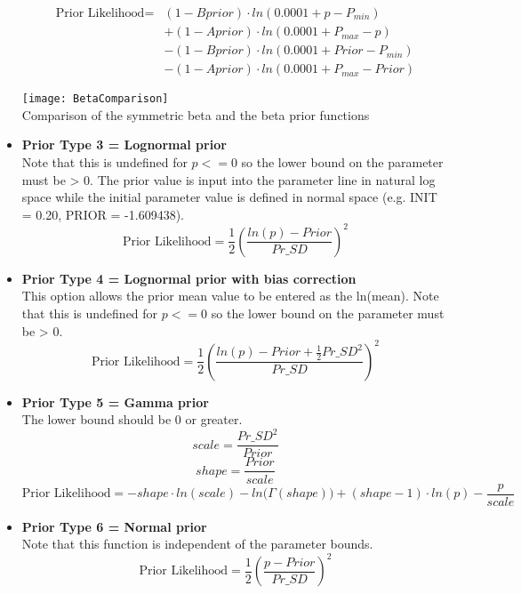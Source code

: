 \begin{itemize}
	\begin{equation}
          \begin{split}
		\text{Prior Likelihood} = & (1 - Bprior) \cdot ln(0.0001 + p - P_{min}) \\
		& + (1 - Aprior) \cdot ln(0.0001 + P_{max} - p) \\
		& - (1 - Bprior) \cdot ln(0.0001 + Prior - P_{min}) \\
		& - (1 - Aprior) \cdot ln(0.0001 + P_{max} - Prior)
	  \end{split}
	\end{equation}

	\begin{center}
		\texttt{[image: BetaComparison]}\\
		Comparison of the symmetric beta and the beta prior functions
	\end{center}

\item \textbf{Prior Type 3 = Lognormal prior} \\ 
Note that this is undefined for $p <= 0$ so the lower bound on the parameter must be > 0. The prior value is input into the parameter line in natural log space while the initial parameter value is defined in normal space (e.g. INIT = 0.20, PRIOR = -1.609438).
	\begin{equation}
	\text{Prior Likelihood} = \frac{1}{2} \left(\frac{ln(p)-Prior}{Pr\_SD}\right)^2
	\end{equation}

\item \textbf{Prior Type 4 = Lognormal prior with bias correction} \\ 
This option allows the prior mean value to be entered as the ln(mean). Note that this is undefined for $p <= 0$ so the lower bound on the parameter must be > 0.
	\begin{equation}
	\text{Prior Likelihood} = \frac{1}{2} \left(\frac{ln(p)-Prior + \frac{1}{2}{Pr\_SD}^2}{Pr\_SD}\right)^2
	\end{equation}

\item \textbf{Prior Type 5 = Gamma prior} \\ 
The lower bound should be 0 or greater.
	\begin{equation}
          scale = \frac{{Pr\_SD}^2}{Prior}
	\end{equation}
	\begin{equation}
          shape = \frac{Prior}{scale}
	\end{equation}
	\begin{equation}
          \text{Prior Likelihood} = -shape \cdot ln(scale) - ln\big(\Gamma(shape)\big) + (shape - 1) \cdot ln(p) - \frac{p}{scale}
	\end{equation}

\item \textbf{Prior Type 6 = Normal prior} \\ 
Note that this function is independent of the parameter bounds.
		\begin{equation}
		\text{Prior Likelihood} = \frac{1}{2} \left(\frac{p - Prior}{Pr\_SD}\right)^2
		\end{equation}
\end{itemize}

